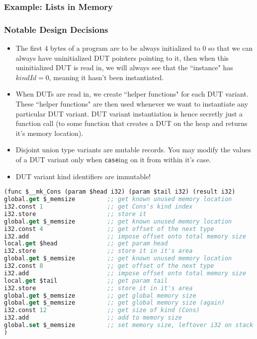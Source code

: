 \documentclass{beamer}
\begin{document}
\begin{frame}
\frametitle{Example: Lists in Memory}
\begin{figure}
  
\end{figure}
\end{frame}


\begin{frame}
\frametitle{Notable Design Decisions}

\begin{itemize}
 \item<1-> The first 4 bytes of a program are to be always initialized to 0 so that we can always have uninitialized DUT pointers pointing to it, then when this uninitialized DUT is read in, we will always see that the ``instance" has $kindId = 0$, meaning it hasn't been instantiated.
 \item<2-> When DUTs are read in, we create ``helper functions" for each DUT variant. These ``helper functions" are then used whenever we want to instantiate any particular DUT variant. DUT variant instantiation is hence secretly just a function call (to some function that creates a DUT on the heap and returns it's memory location).
 \item<3-> Disjoint union type variants are mutable records. You may modify the values of a DUT variant only when \texttt{case}ing on it from within it's case. 
 \item<4-> DUT variant kind identifiers are immutable!
\end{itemize}
\end{frame}

\begin{lrbox}{\exampleInstantiationHelper}
\begin{lstlisting}[language=Lisp,basicstyle=\tiny]
(func $__mk_Cons (param $head i32) (param $tail i32) (result i32)
global.get $_memsize         ;; get known unused memory location
i32.const 1                  ;; get Cons's kind index
i32.store                    ;; store it
global.get $_memsize         ;; get known unused memory location
i32.const 4                  ;; get offset of the next type
i32.add                      ;; impose offset onto total memory size
local.get $head              ;; get param head
i32.store                    ;; store it in it's area
global.get $_memsize         ;; get known unused memory location
i32.const 8                  ;; get offset of the next type
i32.add                      ;; impose offset onto total memory size
local.get $tail              ;; get param tail
i32.store                    ;; store it in it's area
global.get $_memsize         ;; get global memory size
global.get $_memsize         ;; get global memory size (again)
i32.const 12                 ;; get size of kind (Cons)
i32.add                      ;; add to memory size
global.set $_memsize         ;; set memory size, leftover i32 on stack which is the returned pointer to the generated Cons
)
\end{lstlisting}
\end{lrbox}
\end{document}
